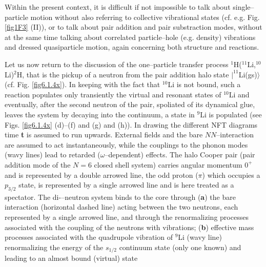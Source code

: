 Within the present context, it is difficult if not impossible to talk about single--particle motion without also referring to collective vibrational states (cf. e.g. Fig. \ref{fig1F3} (II)), or to talk about pair addition and pair substraction modes, without at the same time talking about correlated particle--hole (e.g. density) vibrations and dressed quasiparticle motion,  again concerning both  structure and reactions. 

 Let us now return to the discussion of the one--particle transfer process $^1$H($^{11}$Li,$^{10}$Li)$^2$H, that is the pickup of a neutron from the pair addition halo state $|^{11}$Li(gs)$\rangle$ (cf. Fig. \ref{fig6.1.4x}). In keeping with the fact that $^{10}$Li is not
bound, such a reaction populates only transiently the virtual and resonant states of $^{10}$Li and eventually, after the second neutron of the pair,
spoliated of its dynamical glue, leaves the system by decaying into the continuum, a state in $^{9}$Li is populated (see Figs. \ref{fig6.1.4x} (d)--(f) and  (g) and (h)). In drawing the different NFT diagrams
time \textbf{t} is assumed to run upwards. External fields and the bare $NN$--interaction are assumed to act instantaneously, while the couplings to the
phonon modes (wavy lines) lead to retarded ($\omega$--dependent) effects.  The halo Cooper pair (pair addition mode of the $N=6$
closed shell system) carries angular momentum $0^+$ and is represented by a double arrowed line, the odd proton ($\pi$) which occupies a $p_{3/2}$
state, is represented by a single arrowed line and is here treated as a spectator. The di-–neutron system binds to the core through (\textbf{a}) the bare interaction (horizontal
dashed line) acting between the two neutrons, each represented by a single arrowed line, and through the renormalizing processes associated with the coupling of the neutrons with vibrations; (\textbf{b}) effective mass processes associated with the
quadrupole vibration of $^9$Li (wavy line) renormalizing the energy of the $s_{1/2}$ continuum state (only one known) and leading to an almost bound (virtual) state
